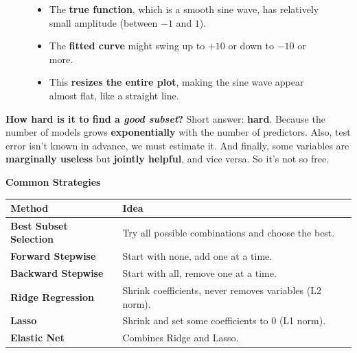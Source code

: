 \begin{figure}[!htp]
{\begin{itemize}
        \begin{itemize}
            \item The \textbf{true function}, which is a smooth sine wave, has relatively small amplitude (between $-1$ and $1$).
            \item The \textbf{fitted curve} might swing up to $+10$ or down to $-10$ or more.
            \item This \textbf{resizes the entire plot}, making the sine wave appear almost flat, like a straight line.
        \end{itemize}
    \end{itemize}}
\end{figure}

\highspace
\textcolor{Red2}{ \textbf{How hard is it to find a \emph{good subset}?}} Short answer: \textbf{hard}. Because the number of models grows \textbf{exponentially} with the number of predictors. Also, test error isn't known in advance, we must estimate it. And finally, some variables are \textbf{marginally useless} but \textbf{jointly helpful}, and vice versa. So it's not so free.

\highspace
\begin{flushleft}
    \textcolor{Green3}{ \textbf{Common Strategies}}
\end{flushleft}
\begin{table}[!htp]
    \centering
    \begin{adjustbox}{width={\textwidth},totalheight={\textheight},keepaspectratio}
        \begin{tabular}{@{} l l @{}}
            \toprule
            Method & Idea \\
            \midrule
            \textbf{Best Subset Selection}  & Try all possible combinations and choose the best.           \\ [.3em]
            \textbf{Forward Stepwise}       & Start with none, add one at a time.                        \\ [.3em]
            \textbf{Backward Stepwise}      & Start with all, remove one at a time.                      \\ [.3em]
            \textbf{Ridge Regression}       & Shrink coefficients, never removes variables (L2 norm).    \\ [.3em]
            \textbf{Lasso}                  & Shrink and set some coefficients to 0 (L1 norm).       \\ [.3em]
            \textbf{Elastic Net}            & Combines Ridge and Lasso.                                    \\
            \bottomrule
        \end{tabular}
    \end{adjustbox}
\end{table}